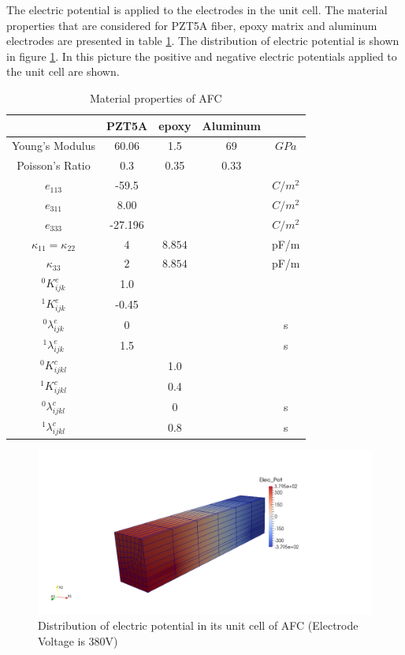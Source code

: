 The electric potential is applied to the electrodes in the unit cell.
The material properties that are considered for PZT5A fiber, epoxy matrix and aluminum electrodes are presented in table \ref{table:materila_properties_afc}.
The distribution of electric potential is shown in figure \ref{fig:electrip_potential_afc_pictur}.
In this picture the positive and negative electric potentials applied to the unit cell are shown.

\begin{table}
\caption{Material properties of AFC}
\centering
\begin{tabular}{ccccc} \hline
               & PZT5A & epoxy & Aluminum & \\ \hline 
Young's Modulus&60.06 & 1.5     & 69       &$GPa$    \\ 
Poisson's Ratio&$0.3$ & 0.35    & 0.33 &\\  
$e_{113}$      &-59.5 &         &      &$C/m^2$\\ 
$e_{311}$      &8.00&         &      &$C/m^2$\\ 
$e_{333}$      &-27.196  &         &      &$C/m^2$\\ 
$\kappa_{11}=\kappa_{22}$ &  $ 4  $ & $8.854  $ & &  pF/m \\ 
$\kappa_{33}$ & $2  $              & $8.854  $ & &  pF/m \\ 
${}^{0}K_{ijk}^{e}$&1.0& & &  \\ 
${}^{1}K_{ijk}^{e}$&-0.45& & & \\ 
${}^{0}\lambda_{ijk}^{e}$&0& & & s \\ 
${}^{1}\lambda_{ijk}^{e}$&1.5& & & s \\  
${}^{0}K_{ijkl}^{c}$& &1.0 & &  \\  
${}^{1}K_{ijkl}^{c}$& &0.4 & & \\ 
${}^{0}\lambda_{ijkl}^{c}$& &0&  & s\\ 
${}^{1}\lambda_{ijkl}^{c}$& &0.8 & & s \\ \hline 
\end{tabular}
\label{table:materila_properties_afc} 
\end{table}

\begin{figure} 
\centering
\includegraphics[width=5.0in]{./chap_4_structural_analyses/afc_unit_cell/afc_electrip_potential_distribution.png}
\caption{Distribution of electric potential in its unit cell of AFC (Electrode Voltage is 380V)}
\label{fig:electrip_potential_afc_pictur}  
\end{figure}  


